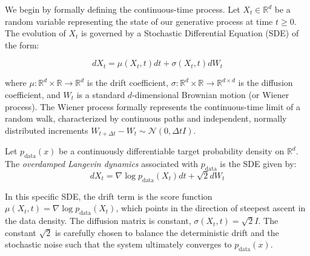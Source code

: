 We begin by formally defining the continuous-time process. Let $X_t \in \mathbb{R}^d$ be a random variable representing the state of our generative process at time $t \ge 0$. The evolution of $X_t$ is governed by a Stochastic Differential Equation (SDE) of the form:

\begin{equation}
    dX_t = \mu(X_t, t) dt + \sigma(X_t, t) dW_t
\end{equation}

where $\mu: \mathbb{R}^d \times \mathbb{R} \to \mathbb{R}^d$ is the drift coefficient, $\sigma: \mathbb{R}^d \times \mathbb{R} \to \mathbb{R}^{d \times d}$ is the diffusion coefficient, and $W_t$ is a standard $d$-dimensional Brownian motion (or Wiener process). The Wiener process formally represents the continuous-time limit of a random walk, characterized by continuous paths and independent, normally distributed increments $W_{t+\Delta t} - W_t \sim \mathcal{N}(0, \Delta t I)$.

\begin{definition}
Let $p_{\text{data}}(x)$ be a continuously differentiable target probability density on $\mathbb{R}^d$. The \emph{overdamped Langevin dynamics} associated with $p_{\text{data}}$ is the SDE given by:
\begin{equation}
    dX_t = \nabla \log p_{\text{data}}(X_t) dt + \sqrt{2} dW_t
\end{equation}
\end{definition}

In this specific SDE, the drift term is the score function $\mu(X_t, t) = \nabla \log p_{\text{data}}(X_t)$, which points in the direction of steepest ascent in the data density. The diffusion matrix is constant, $\sigma(X_t, t) = \sqrt{2} I$. The constant $\sqrt{2}$ is carefully chosen to balance the deterministic drift and the stochastic noise such that the system ultimately converges to $p_{\text{data}}(x)$.


